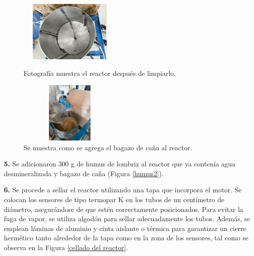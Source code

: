 \documentclass[12pt]{article}
\begin{document}
				\begin{figure}[H]
				\centering
				\begin{minipage}{0.46\textwidth}
					\centering
					\includegraphics[width=5cm, height=3cm]{imagenes/reactor limpio} %
					\caption{Fotografía muestra el reactor después de limpiarlo.}
					\label{progra 1}
				\end{minipage}
				\hfill
				\begin{minipage}{0.48\textwidth}
					\centering
					\includegraphics[width=5cm, height=3cm]{imagenes/biologico5} %
					\caption{Se muestra como se agrega el bagazo de caña al reactor.}
					\label{progra 2}
				\end{minipage}
			\end{figure}
			
			\textbf{5.}	Se adicionaron 300 g de humus de lombriz al reactor que ya contenía agua desmineralizada y bagazo de caña (Figura \ref{humus2}).
			

			\textbf{6.} Se procede a sellar el reactor utilizando una tapa que incorpora el motor. Se colocan los sensores de tipo termopar K en los tubos de un centímetro de diámetro, asegurándose de que estén correctamente posicionados. Para evitar la fuga de vapor, se utiliza algodón para sellar adecuadamente los tubos. Además, se emplean láminas de aluminio y cinta aislante o térmica para garantizar un cierre hermético tanto alrededor de la tapa como en la zona de los sensores, tal como se observa en la Figura \ref{cellado del reactor}.
			
		
			
\end{document}
